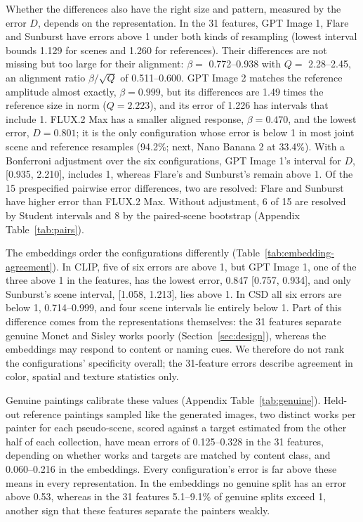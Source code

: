 \documentclass[10pt]{article}
\begin{document}
Whether the differences also have the right size and pattern, measured by the error $D$, depends on
the representation. In the 31 features, GPT Image 1, Flare and Sunburst have errors above 1 under
both kinds of resampling (lowest interval bounds 1.129 for scenes and 1.260 for references). Their
differences are not missing but too large for their alignment: $\beta=$ 0.772--0.938 with
$Q=$ 2.28--2.45, an alignment ratio $\beta/\sqrt{Q}$ of 0.511--0.600. GPT Image 2 matches the
reference amplitude almost exactly, $\beta=0.999$, but its differences are 1.49 times the reference
size in norm ($Q=2.223$), and its error of 1.226 has intervals that include 1. FLUX.2 Max has a
smaller aligned response, $\beta=0.470$, and the lowest error, $D=0.801$; it is the only
configuration whose error is below 1 in most joint scene and reference resamples (94.2\%; next,
Nano Banana 2 at 33.4\%). With a Bonferroni adjustment over the six configurations, GPT Image 1's
interval for $D$, [0.935, 2.210], includes 1, whereas Flare's and Sunburst's remain above 1. Of the
15 prespecified pairwise error differences, two are resolved: Flare and Sunburst have higher error
than FLUX.2 Max. Without adjustment, 6 of 15 are resolved by Student intervals and 8 by the
paired-scene bootstrap (Appendix Table~\ref{tab:pairs}).



The embeddings order the configurations differently (Table~\ref{tab:embedding-agreement}). In CLIP,
five of six errors are above 1, but GPT Image 1, one of the three above 1 in the features, has the
lowest error, 0.847 [0.757, 0.934], and only Sunburst's scene interval, [1.058, 1.213], lies above
1. In CSD all six errors are below 1, 0.714--0.999, and four scene intervals lie entirely below 1.
Part of this difference comes from the representations themselves: the 31 features separate
genuine Monet and Sisley works poorly (Section~\ref{sec:design}), whereas the embeddings may respond
to content or naming cues. We therefore do not rank the configurations' specificity overall; the
31-feature errors describe agreement in color, spatial and texture statistics only.

Genuine paintings calibrate these values (Appendix Table~\ref{tab:genuine}). Held-out reference
paintings sampled like the generated images, two distinct works per painter for each pseudo-scene,
scored against a target estimated from the other half of each collection, have mean errors of
0.125--0.328 in the 31 features, depending on whether works and targets are matched by content
class, and 0.060--0.216 in the embeddings. Every configuration's error is far above these means in
every representation. In the embeddings no genuine split has an error above 0.53, whereas in the 31
features 5.1--9.1\% of genuine splits exceed 1, another sign that these features separate the
painters weakly.
\end{document}
